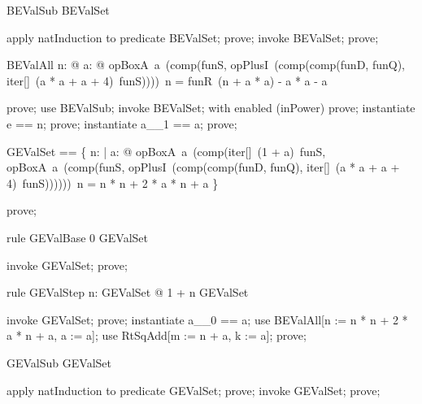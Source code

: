 \documentclass{article}
\begin{document}
\begin{theorem}{BEValSub}
  \nat \subseteq BEValSet
\end{theorem}

\begin{zproof}
apply natInduction to predicate \nat \subseteq BEValSet;
prove;
invoke BEValSet;
prove;
\end{zproof}

\begin{theorem}{BEValAll}
  \forall n: \nat @ \forall a: \nat @ opBoxA~a~(comp(funS, opPlusI~(comp(comp(funD, funQ), iter[\nat]~(a * a + a + 4)~funS))))~n = funR~(n + a * a) - a * a - a
\end{theorem}

\begin{zproof}
prove;
use BEValSub;
invoke BEValSet;
with enabled (inPower) prove;
instantiate e == n;
prove;
instantiate a\_\_1 == a;
prove;
\end{zproof}

\begin{zed}
  GEValSet == \{ n: \nat | \forall a: \nat @ opBoxA~a~(comp(iter[\nat]~(1 + a)~funS, opBoxA~a~(comp(funS, opPlusI~(comp(comp(funD, funQ), iter[\nat]~(a * a + a + 4)~funS))))))~n = n * n + 2 * a * n + a \}
\end{zed}

\begin{zproof}
prove;
\end{zproof}

\begin{theorem}{rule GEValBase}
  0 \in GEValSet
\end{theorem}

\begin{zproof}
invoke GEValSet;
prove;
\end{zproof}

\begin{theorem}{rule GEValStep}
  \forall n: GEValSet @ 1 + n \in GEValSet
\end{theorem}

\begin{zproof}
invoke GEValSet;
prove;
instantiate a\_\_0 == a;
use BEValAll[n := n * n + 2 * a * n + a, a := a];
use RtSqAdd[m := n + a, k := a];
prove;
\end{zproof}

\begin{theorem}{GEValSub}
  \nat \subseteq GEValSet
\end{theorem}

\begin{zproof}
apply natInduction to predicate \nat \subseteq GEValSet;
prove;
invoke GEValSet;
prove;
\end{zproof}
\end{document}
